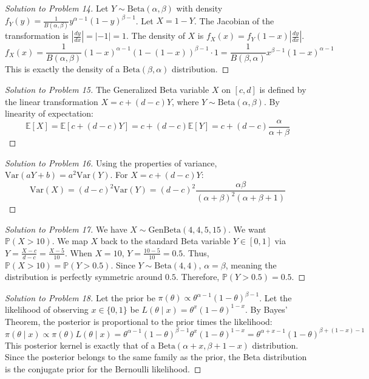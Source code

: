 \documentclass[11pt, a4paper]{article}
\theoremstyle{definition}
\theoremstyle{remark}
\newcommand{\E}{\mathbb{E}}
\newcommand{\Prob}{\mathbb{P}}
\begin{document}
\begin{proof}[Solution to Problem 14]
Let $Y \sim \text{Beta}(\alpha, \beta)$ with density $f_Y(y) = \frac{1}{B(\alpha, \beta)} y^{\alpha-1}(1-y)^{\beta-1}$.
Let $X = 1 - Y$. The Jacobian of the transformation is $\left| \frac{dy}{dx} \right| = |-1| = 1$.
The density of $X$ is $f_X(x) = f_Y(1-x) \left| \frac{dy}{dx} \right|$.
\[
f_X(x) = \frac{1}{B(\alpha, \beta)} (1-x)^{\alpha-1}(1-(1-x))^{\beta-1} \cdot 1 = \frac{1}{B(\beta, \alpha)} x^{\beta-1}(1-x)^{\alpha-1}
\]
This is exactly the density of a $\text{Beta}(\beta, \alpha)$ distribution.
\end{proof}

\begin{proof}[Solution to Problem 15]
The Generalized Beta variable $X$ on $[c, d]$ is defined by the linear transformation $X = c + (d-c)Y$, where $Y \sim \text{Beta}(\alpha, \beta)$.
By linearity of expectation:
\[
\E[X] = \E[c + (d-c)Y] = c + (d-c)\E[Y] = c + (d-c)\frac{\alpha}{\alpha+\beta}
\]
\end{proof}

\begin{proof}[Solution to Problem 16]
Using the properties of variance, $\text{Var}(aY + b) = a^2 \text{Var}(Y)$.
For $X = c + (d-c)Y$:
\[
\text{Var}(X) = (d-c)^2 \text{Var}(Y) = (d-c)^2 \frac{\alpha\beta}{(\alpha+\beta)^2(\alpha+\beta+1)}
\]
\end{proof}

\begin{proof}[Solution to Problem 17]
We have $X \sim \text{GenBeta}(4, 4, 5, 15)$. We want $\Prob(X > 10)$.
We map $X$ back to the standard Beta variable $Y \in [0, 1]$ via $Y = \frac{X-c}{d-c} = \frac{X-5}{10}$.
When $X = 10$, $Y = \frac{10-5}{10} = 0.5$.
Thus, $\Prob(X > 10) = \Prob(Y > 0.5)$.
Since $Y \sim \text{Beta}(4, 4)$, $\alpha = \beta$, meaning the distribution is perfectly symmetric around $0.5$.
Therefore, $\Prob(Y > 0.5) = 0.5$.
\end{proof}

\begin{proof}[Solution to Problem 18]
Let the prior be $\pi(\theta) \propto \theta^{\alpha-1}(1-\theta)^{\beta-1}$.
Let the likelihood of observing $x \in \{0, 1\}$ be $L(\theta \mid x) = \theta^x (1-\theta)^{1-x}$.
By Bayes' Theorem, the posterior is proportional to the prior times the likelihood:
\[
\pi(\theta \mid x) \propto \pi(\theta) L(\theta \mid x) = \theta^{\alpha-1}(1-\theta)^{\beta-1} \theta^x (1-\theta)^{1-x} = \theta^{\alpha+x-1}(1-\theta)^{\beta+(1-x)-1}
\]
This posterior kernel is exactly that of a $\text{Beta}(\alpha+x, \beta+1-x)$ distribution. Since the posterior belongs to the same family as the prior, the Beta distribution is the conjugate prior for the Bernoulli likelihood.
\end{proof}
\end{document}
